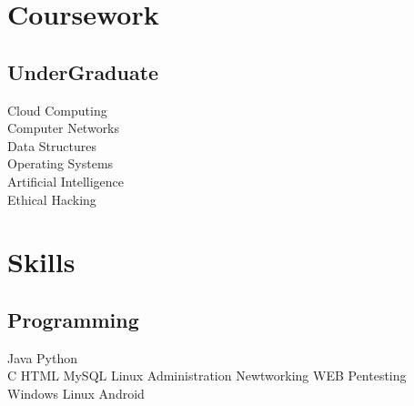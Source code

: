 \documentclass[]{deedy-resume-openfont}
\begin{document}
\begin{minipage}[t]{0.33\textwidth}

\section{Coursework}
\subsection{UnderGraduate}

Cloud Computing \\
Computer Networks \\
Data Structures \\
Operating Systems \\
Artificial Intelligence \\
Ethical Hacking \\ 


\section{Skills}
\subsection{Programming}
Java  \textbullet{} Python \ \\ 
C \textbullet{} HTML \textbullet{} MySQL\textbullet{} Linux Administration 
Newtworking \textbullet{} WEB Pentesting\\
Windows \textbullet{} Linux \textbullet{} Android 
\sectionsep

%
%

\end{minipage} 
\hfill
\end{document}
